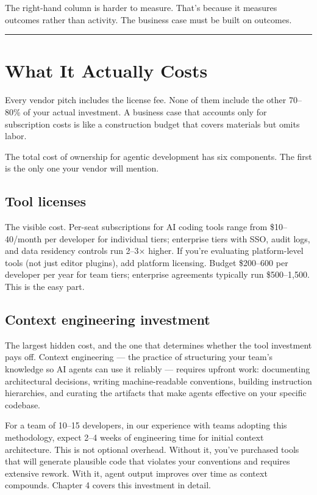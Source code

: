 \documentclass[
  a4paper,
  DIV=11,
  numbers=noendperiod]{scrreprt}
\begin{document}
The right-hand column is harder to measure. That's because it measures
outcomes rather than activity. The business case must be built on
outcomes.

\begin{center}\rule{0.5\linewidth}{0.5pt}\end{center}

\section{What It Actually Costs}\label{what-it-actually-costs}

Every vendor pitch includes the license fee. None of them include the
other 70--80\% of your actual investment. A business case that accounts
only for subscription costs is like a construction budget that covers
materials but omits labor.

The total cost of ownership for agentic development has six components.
The first is the only one your vendor will mention.

\subsection{Tool licenses}\label{tool-licenses}

The visible cost. Per-seat subscriptions for AI coding tools range from
\$10--40/month per developer for individual tiers; enterprise tiers with
SSO, audit logs, and data residency controls run 2--3× higher. If you're
evaluating platform-level tools (not just editor plugins), add platform
licensing. Budget \$200--600 per developer per year for team tiers;
enterprise agreements typically run \$500--1,500. This is the easy part.

\subsection{Context engineering
investment}\label{context-engineering-investment}

The largest hidden cost, and the one that determines whether the tool
investment pays off. Context engineering --- the practice of structuring
your team's knowledge so AI agents can use it reliably --- requires
upfront work: documenting architectural decisions, writing
machine-readable conventions, building instruction hierarchies, and
curating the artifacts that make agents effective on your specific
codebase.

For a team of 10--15 developers, in our experience with teams adopting
this methodology, expect 2--4 weeks of engineering time for initial
context architecture. This is not optional overhead. Without it, you've
purchased tools that will generate plausible code that violates your
conventions and requires extensive rework. With it, agent output
improves over time as context compounds. Chapter 4 covers this
investment in detail.
\end{document}
